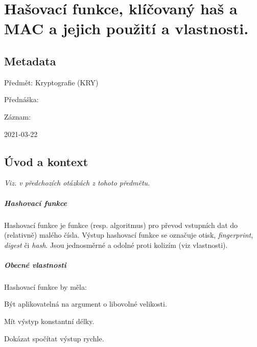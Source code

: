 

\chapter{Hašovací funkce, klíčovaný haš a MAC a jejich použití a vlastnosti.}


\section{Metadata}

\begin{compactitem}
    \item Předmět: Kryptografie (KRY)
    \item Přednáška:
    \begin{compactitem}
        \item {}
    \end{compactitem}
    \item Záznam:
    \begin{compactitem}
        \item 2021-03-22
    \end{compactitem}
\end{compactitem}


\section{Úvod a kontext}

\textit{Viz.  v předchozích otázkách z tohoto předmětu.}

\paragraph*{Hashovací funkce} Hashovací funkce je funkce (resp. algoritmus) pro převod vstupních dat do (relativně) malého čísla. Výstup hashovací funkce se označuje otisk, \textit{fingerprint}, \textit{digest} či \textit{hash}. Jsou jednosměrné a odolné proti kolizím (viz vlastnosti).

\paragraph*{Obecné vlastnosti} Hashovací funkce by měla: \begin{compactitem}
    \item Být aplikovatelná na argument o libovolné velikosti.
    \item Mít výstyp konstantní délky.
    \item Dokázat spočítat výstup rychle.
\end{compactitem}

